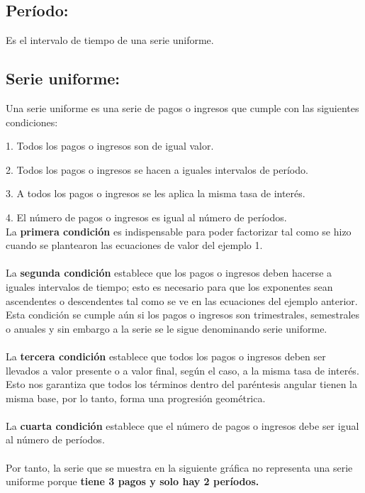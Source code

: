	\subsection{Período:}Es el intervalo de tiempo de una serie uniforme.
	\subsection{Serie uniforme:}Una serie uniforme es una serie de pagos o ingresos que cumple con las siguientes condiciones:
	

	\hspace{35pt}	1. Todos los pagos o ingresos  son de igual valor.

	\hspace{35pt} 2. Todos los pagos o ingresos  se hacen a iguales intervalos de período.

	\hspace{35pt} 3. A todos los pagos o ingresos  se les aplica la misma tasa de interés.

	\hspace{35pt}	4. El número de pagos o ingresos  es igual al número de períodos.
	\\
	La \textbf{primera condición} es indispensable para poder factorizar tal como se hizo cuando se plantearon las ecuaciones de valor del ejemplo 1.
	\\\\
	La \textbf{segunda condición} establece que los pagos o ingresos deben hacerse a iguales intervalos de tiempo; esto es necesario para que los exponentes sean ascendentes o descendentes tal como se ve en las ecuaciones del ejemplo anterior. Esta condición se cumple aún si los pagos o ingresos son trimestrales, semestrales o anuales y sin embargo a la serie se le sigue denominando serie uniforme.
	\\\\
	La \textbf{tercera condición} establece que todos los pagos o ingresos deben ser llevados a valor presente o a valor final, según el caso, a la misma tasa de interés. Esto nos garantiza que todos los términos dentro del paréntesis angular tienen la misma base, por lo tanto, forma una progresión geométrica.
	\\\\
	La \textbf{cuarta condición} establece que el número de pagos o ingresos debe ser igual al número de períodos.
	\\\\
	Por tanto, la serie que se muestra en la siguiente gráfica no representa una serie uniforme porque \textbf{tiene 3 pagos y solo hay 2 períodos.}

